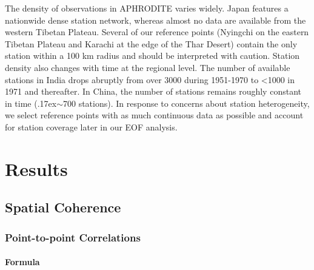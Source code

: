 \documentclass[12pt]{article}
\newcommand{\mytilde}{\raise.17ex\hbox{$\scriptstyle\mathtt{\sim}$}}	%
\begin{document}
	The density of observations in APHRODITE varies widely. Japan features a nationwide dense station network, whereas almost no data are available from the western Tibetan Plateau. Several of our reference points (Nyingchi on the eastern Tibetan Plateau and Karachi at the edge of the Thar Desert) contain the only station within a 100 km radius and should be interpreted with caution. Station density also changes with time at the regional level. The number of available stations in India drops abruptly from over 3000 during 1951-1970 to \textless1000 in 1971 and thereafter. In China, the number of stations remains roughly constant in time (\mytilde 700 stations). In response to concerns about station heterogeneity, we select reference points with as much continuous data as possible and account for station coverage later in our EOF analysis.
	
\section{Results}

\subsection{Spatial Coherence}

\subsubsection{Point-to-point Correlations}

\paragraph{Formula}
\end{document}
